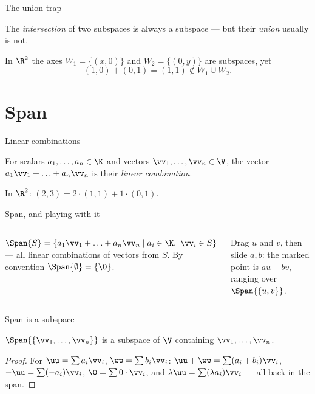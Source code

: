 \begin{frame}{The union trap}
\begin{warning}
The \emph{intersection} of two subspaces is always a subspace — but their \emph{union} usually is not.
\end{warning}

\pause

In $\R^2$ the axes $W_1=\{(x,0)\}$ and $W_2=\{(0,y)\}$ are subspaces, yet
\[
(1,0)+(0,1) = (1,1) \notin W_1\cup W_2.
\]
\end{frame}

\section{Span}

\begin{frame}{Linear combinations}
\begin{definition}
For scalars $a_1,\ldots,a_n\in\K$ and vectors $\vv_1,\ldots,\vv_n\in\V$, the vector
$a_1\vv_1+\ldots+a_n\vv_n$ is their \emph{linear combination}.
\end{definition}

\begin{example}
In $\R^2$: $(2,3) = 2\cdot(1,1)+1\cdot(0,1)$.
\end{example}
\end{frame}

\begin{frame}{Span, and playing with it}
\begin{columns}
\column
\begin{definition}
$\Span{S} = \{a_1\vv_1+\ldots+a_n\vv_n \mid a_i\in\K,\ \vv_i\in S\}$ — all linear combinations of vectors
from $S$. By convention $\Span{\emptyset}=\{\0\}$.
\end{definition}

Drag $u$ and $v$, then slide $a,b$: the marked point is $au+bv$, ranging over $\Span{\{u,v\}}$.
\column
{}
\end{columns}
\end{frame}

\begin{frame}{Span is a subspace}
\begin{theorem}
$\Span{\{\vv_1,\ldots,\vv_n\}}$ is a subspace of $\V$ containing $\vv_1,\ldots,\vv_n$.
\end{theorem}

\pause

\begin{proof}
For $\uu=\sum a_i\vv_i$, $\ww=\sum b_i\vv_i$: $\uu+\ww=\sum(a_i+b_i)\vv_i$, $-\uu=\sum(-a_i)\vv_i$,
$\0=\sum 0\cdot\vv_i$, and $\lambda\uu=\sum(\lambda a_i)\vv_i$ — all back in the span.
\end{proof}
\end{frame}

